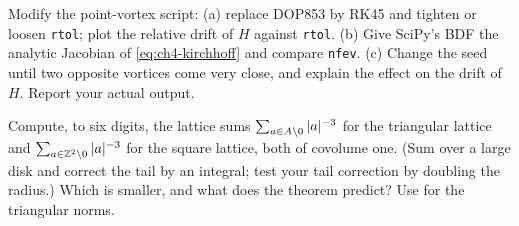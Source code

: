 \begin{exercise}\label{ex:ch4-code}
Modify the point-vortex script: (a) replace DOP853 by RK45 and tighten or loosen \texttt{rtol}; plot the relative
drift of $H$ against \texttt{rtol}. (b) Give SciPy's BDF the analytic Jacobian of \eqref{eq:ch4-kirchhoff} and
compare \texttt{nfev}. (c) Change the seed until two opposite vortices come very close, and explain the effect on
the drift of $H$. Report your actual output.
\end{exercise}

\begin{exercise}\label{ex:ch4-riesz3}
Compute, to six digits, the lattice sums $\sum_{a\in A\setminus0}|a|^{-3}$ for the triangular lattice and
$\sum_{a\in\mathbb{Z}^2\setminus0}|a|^{-3}$ for the square lattice, both of covolume one. (Sum over a large disk and correct
the tail by an integral; test your tail correction by doubling the radius.) Which is smaller, and what does the
theorem predict? Use  for the triangular norms.
\end{exercise}

